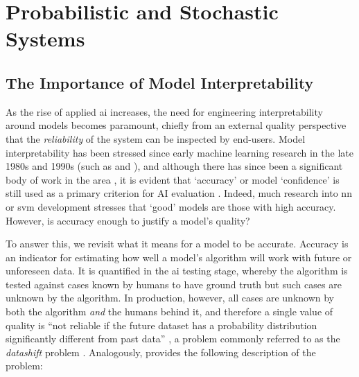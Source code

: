 \section{Probabilistic and Stochastic Systems}
\label{sec:literature-review:probabilistic-stochastic}

\noindent
{}

\noindent
{}

\subsection{The Importance of Model Interpretability}
\label{ssec:literature-review:probabilistic-stochastic:model-interpretability}

As the rise of applied \gls{ai} increases, the need for engineering interpretability around models becomes paramount, chiefly from an external quality perspective that the \textit{reliability} of the system can be inspected by end-users. Model interpretability has been stressed since early machine learning research in the late 1980s and 1990s (such as \citet{Quinlan:1999ue} and \citet{Michie:1988te}), and although there has since been a significant body of work in the area \citep{Singh:2016wu,Baehrens:2010tj,Ribeiro:2016gg,Bussone:2015wm,Ross:2017vn,Lipton:2016if,Boz:2002uv,Johansson:2009uo,Augasta:2012wx,Fung:2005we,Dejaeger:2012up,VanAssche:2007wc,BenDavid:1995up,Feelders:2000ve,Lima:2009tm,Martens:2011uh,Pazzani:1997vp,Verbeke:2011vo}, it is evident that `accuracy' or model `confidence' is still used as a primary criterion for AI evaluation \citep{Huang:2005tc,Japkowicz:2011vy,Sokolova:2009vu}. Indeed, much research into \gls{nn} or \gls{svm} development stresses that `good' models are those with high accuracy. However, is accuracy enough to justify a model's quality?

To answer this, we revisit what it means for a model to be accurate. Accuracy is an indicator for estimating how well a model's algorithm will work with future or unforeseen data. It is quantified in the \gls{ai} testing stage, whereby the algorithm is tested against cases known by humans to have ground truth but such cases are unknown by the algorithm. In production, however, all cases are unknown by both the algorithm \textit{and} the humans behind it, and therefore a single value of quality is ``not reliable if the future dataset has a probability distribution significantly different from past data'' \citep{Freitas:2014ic}, a problem commonly referred to as the \textit{datashift} problem \citep{Sugiyama:2017ud}. Analogously, \citet{Freitas:2014ic} provides the following description of the problem:

